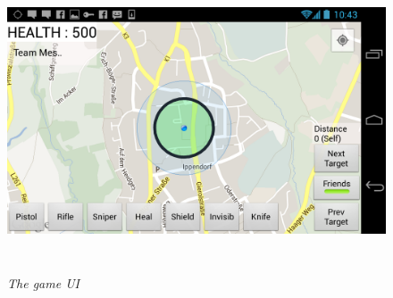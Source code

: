 \begin{figure}
\includegraphics[height=3.5in,width=6.23in]{./images/android_screenshots/second_development/game_second_development_5.png}
\caption{\small \sl The game UI \label{fig:game_ui2}}
\end{figure}

